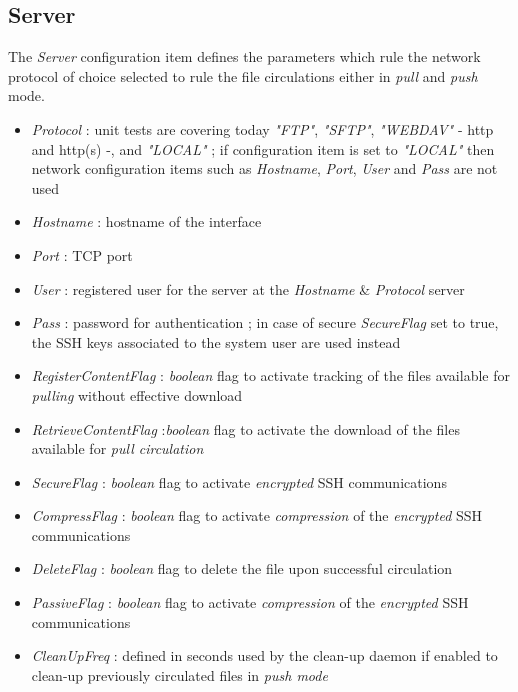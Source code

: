 \documentclass[dec_sum_main.tex]{subfiles}
\begin{document}
\subsection{Server}
The \textit{Server} configuration item defines the parameters which rule the network protocol of choice selected to rule the file circulations either in \textit{pull} and \textit{push} mode.
\par
\noindent
\label{Config_Server}
\begin{itemize}
	\item \textit{Protocol} : unit tests are covering today \textit{"FTP"}, \textit{"SFTP"}, \textit{"WEBDAV"} - http and http(s) -, and\textit{ "LOCAL"} ; if configuration item is set to \textit{"LOCAL"} then network configuration items such as \textit{Hostname}, \textit{Port}, \textit{User} and \textit{Pass} are not used   
	\item \textit{Hostname} : hostname of the interface
	\item \textit{Port} : TCP port
	\item \textit{User} : registered user for the server at the \textit{Hostname} \& \textit{Protocol} server
	\item \textit{Pass} : password for authentication ; in case of secure \textit{SecureFlag} set to true, the SSH keys associated to the system user are used instead
	\item \textit{RegisterContentFlag} : \textit{boolean} flag to activate tracking of the files available for \textit{pulling} without effective download
	\item \textit{RetrieveContentFlag} :\textit{boolean} flag to activate the download of the files available for \textit{pull circulation} 
	\item \textit{SecureFlag} : \textit{boolean} flag to activate \textit{encrypted} SSH communications
	\item \textit{CompressFlag} : \textit{boolean} flag to activate \textit{compression} of the \textit{encrypted} SSH communications
	\label{DeleteFlag}
	\item \textit{DeleteFlag} : \textit{boolean} flag to delete the file upon successful circulation
	\item \textit{PassiveFlag} : \textit{boolean} flag to activate \textit{compression} of the \textit{encrypted} SSH communications
	\item \textit{CleanUpFreq} : defined in seconds used by the clean-up daemon if enabled to clean-up previously circulated files in \textit{push mode}	
\end{itemize}
\end{document}
